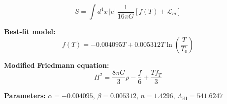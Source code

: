 
\begin{equation}
  S = \int d^4x \, |e| \, \frac{1}{16\pi G} \left[ f(T) + \mathcal{L}_m \right]
\end{equation}

\textbf{Best-fit model:}
\begin{equation}
  f(T) = -0.004095 T + 0.005312 T \ln\!\left(\frac{T}{T_0}\right)
\end{equation}

\textbf{Modified Friedmann equation:}
\begin{equation}
  H^2 = \frac{8\pi G}{3} \rho - \frac{f}{6} + \frac{T f_T}{3}
\end{equation}

\textbf{Parameters:}
$\alpha = -0.004095$, \quad
$\beta = 0.005312$, \quad
$n = 1.4296$, \quad
$\Lambda_{\text{BI}} = 541.6247$